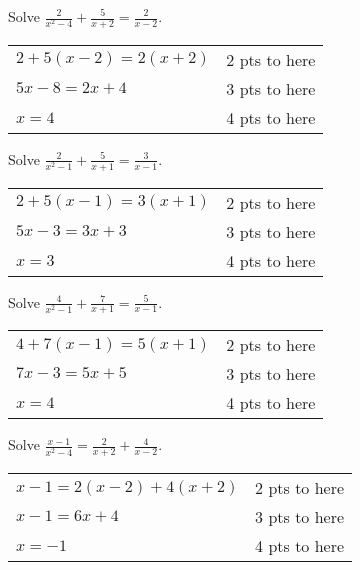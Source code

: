 {
	Solve $\displaystyle \frac{2}{x^2-4}+\frac{5}{x+2}=\frac{2}{x-2}$.
}
{
	\begin{tabular}{l r}
	$2 + 5(x-2)=2(x+2)$ & 2 pts to here \\
	$5x-8=2x+4$ & 3 pts to here\\
	$x=4$ & 4 pts to here
	\end{tabular}
}

{
	Solve $\displaystyle \frac{2}{x^2-1}+\frac{5}{x+1}=\frac{3}{x-1}$.
}
{
	\begin{tabular}{l r}
	$2 + 5(x-1)=3(x+1)$ & 2 pts to here \\
	$5x-3=3x+3$ & 3 pts to here\\
	$x=3$ & 4 pts to here
	\end{tabular}
}

{
	Solve $\displaystyle \frac{4}{x^2-1}+\frac{7}{x+1}=\frac{5}{x-1}$.
}
{
	\begin{tabular}{l r}
	$4 + 7(x-1)=5(x+1)$ & 2 pts to here \\
	$7x-3=5x+5$ & 3 pts to here\\
	$x=4$ & 4 pts to here
	\end{tabular}
}

{
	Solve $\displaystyle \frac{x-1}{x^2-4}=\frac{2}{x+2}+\frac{4}{x-2}$.
}
{
	\begin{tabular}{l r}
	$x-1=2(x-2)+4(x+2)$ & 2 pts to here \\
	$x-1=6x+4$ & 3 pts to here\\
	$x=-1$ & 4 pts to here
	\end{tabular}
}
